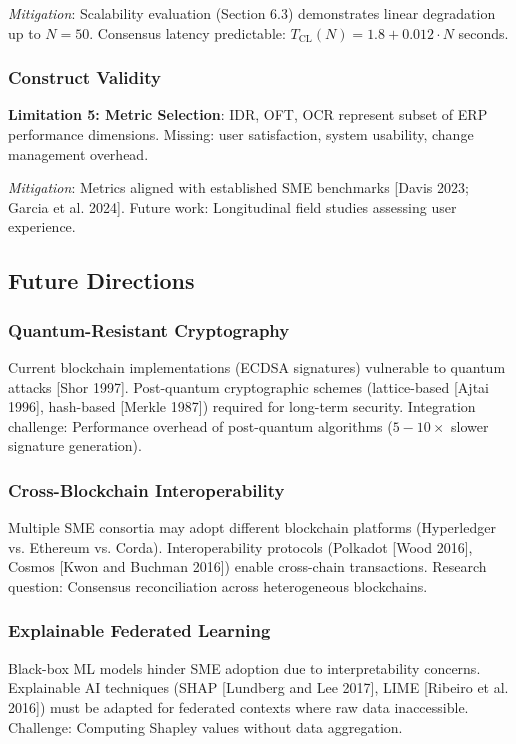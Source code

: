 \documentclass[times,10pt,twocolumn]{jucs2e}
\begin{document}
\textit{Mitigation}: Scalability evaluation (Section 6.3) demonstrates linear degradation up to $N = 50$. Consensus latency predictable: $T_{\text{CL}}(N) = 1.8 + 0.012 \cdot N$ seconds.

\subsubsection{Construct Validity}

\textbf{Limitation 5: Metric Selection}: IDR, OFT, OCR represent subset of ERP performance dimensions. Missing: user satisfaction, system usability, change management overhead.

\textit{Mitigation}: Metrics aligned with established SME benchmarks [Davis 2023; Garcia et al. 2024]. Future work: Longitudinal field studies assessing user experience.

\subsection{Future Directions}

\subsubsection{Quantum-Resistant Cryptography}

Current blockchain implementations (ECDSA signatures) vulnerable to quantum attacks [Shor 1997]. Post-quantum cryptographic schemes (lattice-based [Ajtai 1996], hash-based [Merkle 1987]) required for long-term security. Integration challenge: Performance overhead of post-quantum algorithms ($5-10\times$ slower signature generation).

\subsubsection{Cross-Blockchain Interoperability}

Multiple SME consortia may adopt different blockchain platforms (Hyperledger vs. Ethereum vs. Corda). Interoperability protocols (Polkadot [Wood 2016], Cosmos [Kwon and Buchman 2016]) enable cross-chain transactions. Research question: Consensus reconciliation across heterogeneous blockchains.

\subsubsection{Explainable Federated Learning}

Black-box ML models hinder SME adoption due to interpretability concerns. Explainable AI techniques (SHAP [Lundberg and Lee 2017], LIME [Ribeiro et al. 2016]) must be adapted for federated contexts where raw data inaccessible. Challenge: Computing Shapley values without data aggregation.
\end{document}
